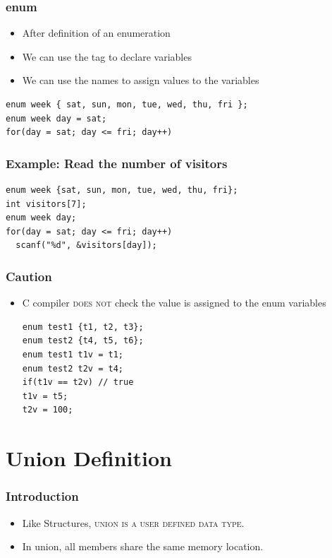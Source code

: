 \documentclass{../c-lecture}
\begin{document}
\begin{frame}[fragile]
  \frametitle{enum}
  \begin{itemize}
    \item After definition of an enumeration
    \item We can use the tag to declare variables
    \item We can use the names to assign values to the variables
  \end{itemize}
  \begin{verbatim}
enum week { sat, sun, mon, tue, wed, thu, fri };
enum week day = sat;
for(day = sat; day <= fri; day++)
  \end{verbatim}
\end{frame}

\begin{frame}[fragile]
  \frametitle{Example: Read the number of visitors}
  \begin{verbatim}
enum week {sat, sun, mon, tue, wed, thu, fri};
int visitors[7];
enum week day;
for(day = sat; day <= fri; day++)
  scanf("%d", &visitors[day]);
  \end{verbatim}
\end{frame}

\begin{frame}[fragile]
  \frametitle{Caution}
  \begin{itemize}
    \item
      C compiler \textsc{\color{RubineRed} does not} check the value is
      assigned to the enum variables

    \begin{verbatim}
enum test1 {t1, t2, t3};
enum test2 {t4, t5, t6};
enum test1 t1v = t1;
enum test2 t2v = t4;
if(t1v == t2v) // true
t1v = t5;
t2v = 100;
    \end{verbatim}
  \end{itemize}
\end{frame}

\section{Union Definition}

\begin{frame}
  \frametitle{Introduction}
  \begin{itemize}
    \item
      Like Structures,
      \textsc{\color{Orange} union is a user defined data type}.
    \item In union, all members share the same memory location.
  \end{itemize}
\end{frame}
\end{document}
